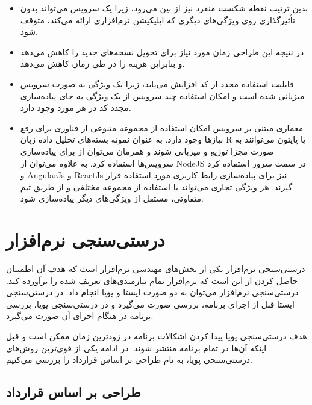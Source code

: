 \begin{itemize}
\item
بدین ترتیب نقطه شکست منفرد نیز از بین می‌رود، زیرا یک سرویس می‌تواند بدون تأثیرگذاری روی ویژگی‌های دیگری که اپلیکیشن نرم‌افزاری ارائه می‌کند، متوقف شود.

\item
در نتیجه این طراحی زمان مورد نیاز برای تحویل نسخه‌های جدید را کاهش می‌دهد و بنابراین هزینه را در طی زمان کاهش می‌دهد.

\item
قابلیت استفاده مجدد از کد افزایش می‌یابد، زیرا یک ویژگی به صورت سرویس میزبانی شده است و امکان استفاده چند سرویس از یک ویژگی به جای پیاده‌سازی مجدد کد در هر مورد وجود دارد.

\item
معماری مبتنی بر سرویس امکان استفاده از مجموعه متنوعی از فناوری برای رفع نیازها وجود دارد. به عنوان نمونه بسته‌های تحلیل داده زبان R یا پایتون می‌توانند به صورت مجزا توزیع و میزبانی شوند و همزمان می‌توان از 
برای پیاده‌سازی سرویس‌ها استفاده کرد. به علاوه می‌توان از NodeJS در سمت سرور استفاده کرد و AngularJs و ReactJs نیز برای پیاده‌سازی رابط کاربری مورد استفاده قرار گیرند. هر ویژگی تجاری می‌تواند با استفاده از مجموعه مختلفی و از طریق تیم متفاوتی، مستقل از ویژگی‌های دیگر پیاده‌سازی شود.

\end{itemize}


\section{درستی‌سنجی نرم‌افزار}
درستی‌سنجی نرم‌افزار یکی از بخش‌های مهندسی نرم‌افزار است که هدف آن اطمینان حاصل کردن از این است که نرم‌افزار تمام نیازمندی‌های تعریف شده را برآورده کند. درستی‌سنجی نرم‌افزار می‌توان به دو صورت ایستا و پویا انجام داد. در درستی‌سنجی ایستا قبل از اجرای برنامه، بررسی صورت می‌گیرد و در درستی‌سنجی پویا، بررسی برنامه در هنگام اجرای آن صورت می‌گیرد. 

هدف درستی‌سنجی پویا پیدا کردن اشکالات برنامه در زودترین زمان ممکن است و قبل اینکه آن‌ها در تمام برنامه منتشر شوند. در ادامه یکی از قوی‌ترین روش‌های درستی‌سنجی پویا، به نام طراحی بر اساس قرارداد
\cite{meyer1997object, mandrioli1992advances, meyer1992applying}
را بررسی می‌کنیم.

\subsection{طراحی بر اساس قرارداد}

